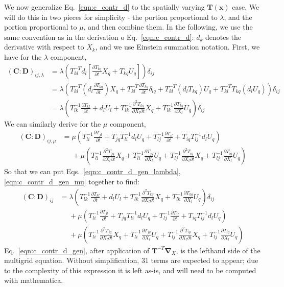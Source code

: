 \documentclass[11pt]{article}
\newcommand{\p}{\partial}
\newcommand{\bC}{\mathbf{C}}
\newcommand{\bD}{\mathbf{D}}
\newcommand{\bT}{\mathbf{T}}
\newcommand{\bx}{\mathbf{x}}
\newcommand{\bgrad}{\boldsymbol{\nabla}}
\begin{document}
We now generalize Eq.~\ref{eqn:c_contr_d} to the spatially varying $\bT(\bx)$ case. We will do this in two pieces for simplicity - the portion proportional to $\lambda$, and the portion proportional to $\mu$, and then combine them. In the following, we use the same convention as in the derivation o Eq.~\ref{eqn:c_contr_d}: $d_k$ denotes the derivative with respect to $X_k$, and we use Einstein summation notation. First, we have for the $\lambda$ component,
\begin{align}
 \left(\bC : \bD\right)_{ij, \lambda} &= \lambda \left(T^{-T}_{kl}d_l\left[\frac{\p T_{kq}}{\p t}X_q + T_{kq}U_q\right]\right)\delta_{ij}\nonumber\\
                                      &= \lambda \left(T^{-T}_{kl}\left(d_l \frac{\p T_{kq}}{\p t}\right)X_q + T^{-T}_{kl}\frac{\p T_{kq}}{\p t}\delta_{lq} + T^{-T}_{kl}(d_l T_{kq})U_q + T^{-T}_{kl}T_{kq}(d_lU_q)\right)\delta_{ij}\nonumber \\
                                      &= \lambda \left(T^{-1}_{lk}\frac{\p T_{kl}}{\p t} + d_l U_l + T^{-1}_{lk}\frac{\p^2 T_{kq}}{\p X_l \p t}X_q + T^{-1}_{lk}\frac{\p T_{kq}}{\p X_l}U_q\right)\delta_{ij}
\label{eqn:c_contr_d_gen_lambda}
\end{align}
We can similarly derive for the $\mu$ component,
\begin{align}
    \left(\bC : \bD\right)_{ij, \mu} &=  \mu \left(T^{-1}_{li}\frac{\p T_{jl}}{\p t} + T_{jq}T^{-1}_{li}d_lU_q + T^{-1}_{lj}\frac{\p T_{il}}{\p t} + T_{iq}T^{-1}_{lj}d_lU_q\right) \nonumber\\
    &\phantom{=} + \mu\left(T_{li}^{-1}\frac{\p^2 T_{jq}}{\p X_l \p t}X_q + T_{li}^{-1}\frac{\p T_{jq}}{\p X_l} U_q + T^{-1}_{lj}\frac{\p^2 T_{iq}}{\p X_l \p t}X_q + T^{-1}_{lj}\frac{\p T_{iq}}{\p X_l}U_q \right)
    \label{eqn:c_contr_d_gen_mu}
\end{align}
So that we can put Eqs.~\ref{eqn:c_contr_d_gen_lambda}, \ref{eqn:c_contr_d_gen_mu} together to find:\begin{align}
 \left(\bC : \bD\right)_{ij} &= \lambda \left(T^{-1}_{lk}\frac{\p T_{kl}}{\p t} + d_l U_l + T^{-1}_{lk}\frac{\p^2 T_{kq}}{\p X_l \p t}X_q + T^{-1}_{lk}\frac{\p T_{kq}}{\p X_l}U_q\right)\delta_{ij}\nonumber\\
    &\phantom{=} + \mu \left(T^{-1}_{li}\frac{\p T_{jl}}{\p t} + T_{jq}T^{-1}_{li}d_lU_q + T^{-1}_{lj}\frac{\p T_{il}}{\p t} + T_{iq}T^{-1}_{lj}d_lU_q\right) \nonumber\\
    &\phantom{=} + \mu\left(T_{li}^{-1}\frac{\p^2 T_{jq}}{\p X_l \p t}X_q + T_{li}^{-1}\frac{\p T_{jq}}{\p X_l} U_q + T^{-1}_{lj}\frac{\p^2 T_{iq}}{\p X_l \p t}X_q + T^{-1}_{lj}\frac{\p T_{iq}}{\p X_l}U_q \right)
    \label{eqn:c_contr_d_gen}
\end{align}
Eq.~\ref{eqn:c_contr_d_gen}, after application of $\bT^{-T}\bgrad_X$, is the lefthand side of the multigrid equation. Without simplification, 31 terms are expected to appear; due to the complexity of this expression it is left as-is, and will need to be computed with mathematica.
\end{document}
